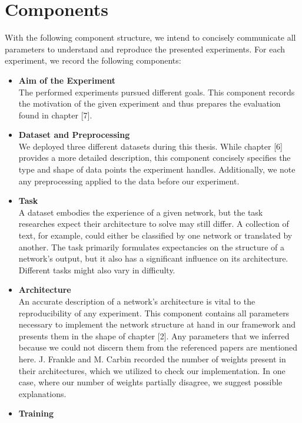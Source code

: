 \section{Components}
With the following component structure, we intend to concisely communicate all parameters to understand and reproduce the presented experiments. For each experiment, we record the following components:
\begin{itemize}
	\item \textbf{Aim of the Experiment}\\
	The performed experiments pursued different goals. This component records the motivation of the given experiment and thus prepares the evaluation found in chapter [7].\\
	\item \textbf{Dataset and Preprocessing}\\
	We deployed three different datasets during this thesis. While chapter [6] provides a more detailed description, this component concisely specifies the type and shape of data points the experiment handles. Additionally, we note any preprocessing applied to the data before our experiment.\\
	\item \textbf{Task}\\
	A dataset embodies the experience of a given network, but the task researches expect their architecture to solve may still differ. A collection of text, for example, could either be classified by one network or translated by another. The task primarily formulates expectancies on the structure of a network's output, but it also has a significant influence on its architecture. Different tasks might also vary in difficulty.\\
	\item \textbf{Architecture}\\
	An accurate description of a network's architecture is vital to the reproducibility of any experiment. This component contains all parameters necessary to implement the network structure at hand in our framework and presents them in the shape of chapter [2]. Any parameters that we inferred because we could not discern them from the referenced papers are mentioned here.
	J. Frankle and M. Carbin recorded the number of weights present in their architectures, which we utilized to check our implementation. In one case, where our number of weights partially disagree, we suggest possible explanations.\\
	\item \textbf{Training}\\  

\end{itemize}
